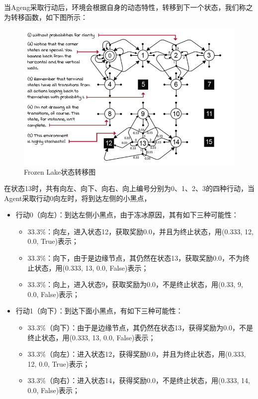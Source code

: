 当Ageng采取行动后，环境会根据自身的动态特性，转移到下一个状态，我们称之为转移函数，如下图所示：
\begin{figure}[H]
	\caption{Frozen Lake状态转移图}
	\label{p000008}
	\centering
	\includegraphics[width=15cm]{images/p000008}
\end{figure}
在状态13时，共有向左、向下、向右、向上编号分别为0、1、2、3的四种行动，当Agent采取行动0向左时，将到达左侧的小黑点，
\begin{itemize}
    \item 行动0（向左）：到达左侧小黑点，由于冻冰原因，其有如下三种可能性：
    \begin{itemize}
        \item 33.3\%：向左，进入状态12，获取奖励0.0，并且为终止状态，用(0.333, 12, 0.0, True)表示；
        \item 33.3\%：向下，由于是边缘节点，其仍然在状态13，获取奖励0.0，不为终止状态，用(0.333, 13, 0.0, False)表示；
        \item 33.3\%：向上，进入状态9，获取奖励为0.0，不是终止状态，用(0.33, 9, 0.0, False)表示；
    \end{itemize}
    \item 行动1（向下）：到达下面小黑点，有如下三种可能性：
    \begin{itemize}
        \item 33.3\%（向下）：由于是边缘节点，其仍然在状态13，获得奖励为0.0，不是终止状态，用(0.333, 13, 0.0, False)表示；
        \item 33.3\%（向左）：进入状态12，获得奖励0.0，并且为终止状态，用(0.333, 12, 0.0, True)表示；
        \item 33.3\%（向右）：进入状态14，获得奖励0.0，不是终止状态，用(0.333, 14, 0.0, False)表示；
    \end{itemize}
\end{itemize}

